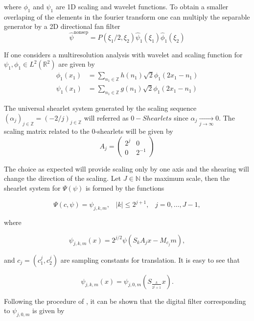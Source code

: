 where $\phi_1$ and $\psi_1$ are 1D scaling and wavelet functions. To obtain a smaller overlaping of the elements in the fourier transform one can multiply the separable generator by a 2D directional fan filter
$$
\hat{\psi}^{\text{nonsep}}=P(\xi_1/2,\xi_2)\hat{\psi}_1(\xi_1)\hat{\phi}_1(\xi_2)
$$ 

\bigskip

If one considers a multiresolution analysis with wavelet and scaling function for $\psi_1,\phi_1\in L^2(\mathbb{R}^2)$ are given by
$$
\begin{aligned}
\phi_1(x_1)&=\sum_{n_1\in\mathbb{Z}}h(n_1)\sqrt{2}\phi_1(2x_1-n_1)\\
\psi_1(x_1)&=\sum_{n_1\in\mathbb{Z}}g(n_1)\sqrt{2}\phi_1(2x_1-n_1)
\end{aligned}
$$

\bigskip

The universal shearlet system generated by the scaling sequence $(\alpha_j)_{j\in \mathbb{Z}}=(-2/j)_{j\in\mathbb{Z}}$ will referred as $0-Shearlets$ since $\alpha_j\underset{j\rightarrow\infty}\longrightarrow 0$. The scaling matrix related to the $0$-shearlets will be given by
$$
A_{j}=\left(\begin{matrix} 2^j & 0\\ 0 & 2^{-1}\end{matrix}\right)
$$

The choice as expected will provide scaling only by one axis and the shearing will change the direction of the scaling. Let $J\in\mathbb{N}$ the maximum scale, then the shearlet system for $\Psi(\psi)$ is formed by the functions

$$
\Psi(c,\psi)=\psi_{j,k,m}\textrm{,}\quad |k|\leq 2^{j+1}\textrm{,}\quad j=0,\ldots,J-1,
$$

where

\begin{equation}
\label{eq:LFshearlets3}
\psi_{j,k,m}(x)=2^{j/2}\psi(S_kA_jx-M_{c_j}m),
\end{equation}

and $c_j=(c_1^j,c_2^j)$ are sampling constants for translation. It is easy to see that

\begin{equation}
\label{eq:LFshearlets4}
\psi_{j,k,m}(x)=\psi_{j,0,m}\left( S_{\frac{k}{2^j+1}}x\right).
\end{equation}

Following the procedure of \cite{Shearlab}, it can be shown that the digital filter corresponding to $\psi_{j,0,m}$ is given by

